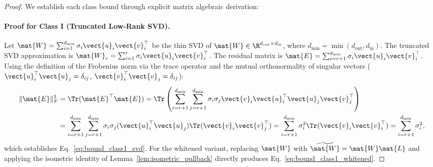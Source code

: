 \begin{proof}
We establish each class bound through explicit matrix algebraic derivation:

\paragraph{Proof for Class I (Truncated Low-Rank SVD).}
Let $\mat{W} = \sum_{i=1}^{d_{\min}} \sigma_i \vect{u}_i \vect{v}_i^\top$ be the thin SVD of $\mat{W} \in \R^{d_{\text{out}} \times d_{\text{in}}}$, where $d_{\min} = \min(d_{\text{out}}, d_{\text{in}})$. The truncated SVD approximation is $\mat{W}_r = \sum_{i=1}^r \sigma_i \vect{u}_i \vect{v}_i^\top$. The residual matrix is $\mat{E} = \sum_{i=r+1}^{d_{\min}} \sigma_i \vect{u}_i \vect{v}_i^\top$. Using the definition of the Frobenius norm via the trace operator and the mutual orthonormality of singular vectors ($\vect{u}_i^\top \vect{u}_j = \delta_{ij}$, $\vect{v}_i^\top \vect{v}_j = \delta_{ij}$):
\begin{align}
\|\mat{E}\|_F^2 &= \Tr(\mat{E}^\top \mat{E}) = \Tr\left( \sum_{i=r+1}^{d_{\min}} \sum_{j=r+1}^{d_{\min}} \sigma_i \sigma_j \vect{v}_i \vect{u}_i^\top \vect{u}_j \vect{v}_j^\top \right) \nonumber \\
&= \sum_{i=r+1}^{d_{\min}} \sum_{j=r+1}^{d_{\min}} \sigma_i \sigma_j (\vect{u}_i^\top \vect{u}_j) \Tr(\vect{v}_i \vect{v}_j^\top) = \sum_{i=r+1}^{d_{\min}} \sigma_i^2 \Tr(\vect{v}_i \vect{v}_i^\top) = \sum_{i=r+1}^{d_{\min}} \sigma_i^2,
\end{align}
which establishes Eq.~\eqref{eq:bound_class1_svd}. For the whitened variant, replacing $\mat{W}$ with $\widetilde{\mat{W}} = \mat{W}\mat{L}$ and applying the isometric identity of Lemma~\ref{lem:isometric_pullback} directly produces Eq.~\eqref{eq:bound_class1_whitened}.


\end{proof}
